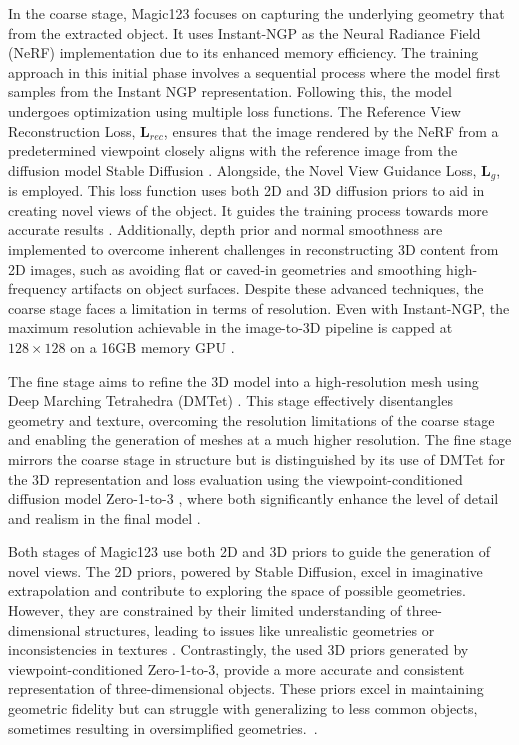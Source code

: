 In the coarse stage, Magic123 focuses on capturing the underlying geometry that from the extracted object. It uses Instant-NGP as the Neural Radiance Field (NeRF) implementation due to its enhanced memory efficiency. The training approach in this initial phase involves a sequential process where the model first samples from the Instant NGP representation. Following this, the model undergoes optimization using multiple loss functions. The Reference View Reconstruction Loss, \(\mathbf{L}_{rec}\), ensures that the image rendered by the NeRF from a predetermined viewpoint closely aligns with the reference image from the diffusion model Stable Diffusion \citep{rombachStableDiffusion}. Alongside, the Novel View Guidance Loss, \(\mathbf{L}_{g}\), is employed. This loss function uses both 2D and 3D diffusion priors to aid in creating novel views of the object. It guides the training process towards more accurate results \citep{qian2023magic123}. Additionally, depth prior and normal smoothness are implemented to overcome inherent challenges in reconstructing 3D content from 2D images, such as avoiding flat or caved-in geometries and smoothing high-frequency artifacts on object surfaces. Despite these advanced techniques, the coarse stage faces a limitation in terms of resolution. Even with Instant-NGP, the maximum resolution achievable in the image-to-3D pipeline is capped at \(128 \times 128\) on a 16GB memory GPU \citep{qian2023magic123}.

The fine stage aims to refine the 3D model into a high-resolution mesh using Deep Marching Tetrahedra (DMTet) \citep{qian2023magic123,shen2021DMTet}. This stage effectively disentangles geometry and texture, overcoming the resolution limitations of the coarse stage and enabling the generation of meshes at a much higher resolution. The fine stage mirrors the coarse stage in structure but is distinguished by its use of DMTet for the 3D representation and loss evaluation using the viewpoint-conditioned diffusion model Zero-1-to-3 \citep{liu2023zero1to3}, where both significantly enhance the level of detail and realism in the final model \citep{qian2023magic123}.

Both stages of Magic123 use both 2D and 3D priors to guide the generation of novel views. The 2D priors, powered by Stable Diffusion, excel in imaginative extrapolation and contribute to exploring the space of possible geometries. However, they are constrained by their limited understanding of three-dimensional structures, leading to issues like unrealistic geometries or inconsistencies in textures \citep{qian2023magic123}. Contrastingly, the used 3D priors generated by viewpoint-conditioned Zero-1-to-3, provide a more accurate and consistent representation of three-dimensional objects. These priors excel in maintaining geometric fidelity but can struggle with generalizing to less common objects, sometimes resulting in oversimplified geometries.~\citep{qian2023magic123}.
